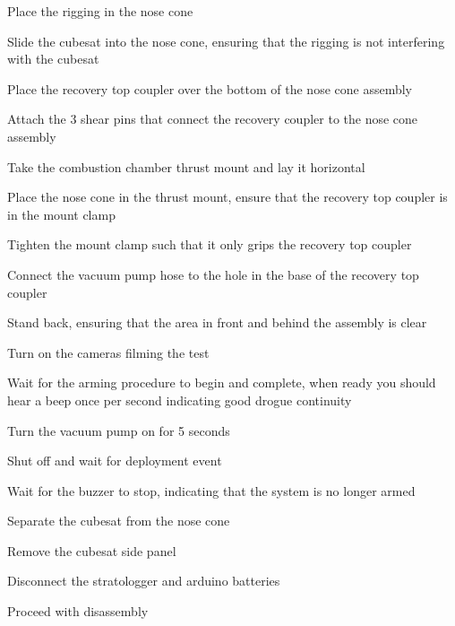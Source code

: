 \begin{checklist}
    \item \auth{} Place the rigging in the nose cone
    \item \auth{} Slide the cubesat into the nose cone, ensuring that the rigging is not interfering with the cubesat
    \item \auth{} Place the recovery top coupler over the bottom of the nose cone assembly
    \item \auth{} Attach the 3 shear pins that connect the recovery coupler to the nose cone assembly
    \item \auth{} Take the combustion chamber thrust mount and lay it horizontal
    \item \auth{} Place the nose cone in the thrust mount, ensure that the recovery top coupler is in the mount clamp
    \item \auth{} Tighten the mount clamp such that it only grips the recovery top coupler
    \item \auth{} Connect the vacuum pump hose to the hole in the base of the recovery top coupler
    \item \auth{} Stand back, ensuring that the area in front and behind the assembly is clear
    \item \auth{} Turn on the cameras filming the test
    \item \auth{} Wait for the arming procedure to begin and complete, when ready you should hear a beep once per second indicating good drogue continuity
    \item \auth{} Turn the vacuum pump on for 5 seconds
    \item \auth{} Shut off and wait for deployment event
    \item \auth{} Wait for the buzzer to stop, indicating that the system is no longer armed
    \item \auth{} Separate the cubesat from the nose cone
    \item \auth{} Remove the cubesat side panel
    \item \auth{} Disconnect the stratologger and arduino batteries
    \item \auth{} Proceed with disassembly
\end{checklist}
\setcounter{checklistnum}{0}


